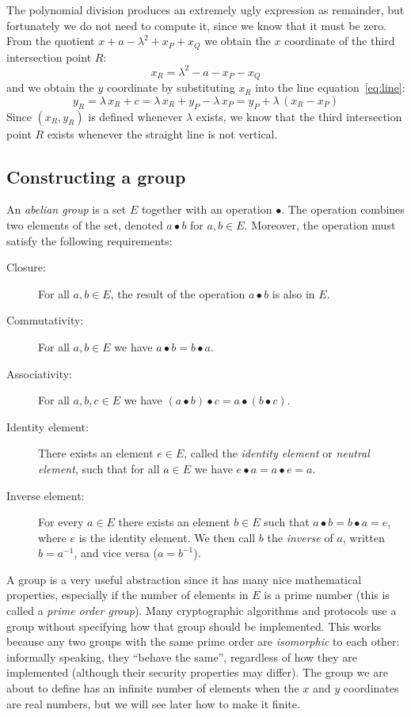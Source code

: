 \documentclass{article}
\begin{document}
The polynomial division produces an extremely ugly expression as remainder, but fortunately we do not need to compute it, since we know that it must be zero.
From the quotient $x + a - \lambda^2 + x_P + x_Q$ we obtain the $x$ coordinate of the third intersection point $R$:
\begin{equation}
x_R = \lambda^2 - a - x_P - x_Q \label{eq:xR}
\end{equation}
and we obtain the $y$ coordinate by substituting $x_R$ into the line equation~\eqref{eq:line}:
\begin{equation}
y_R = \lambda\,x_R + c = \lambda\,x_R + y_P - \lambda\,x_P = y_P + \lambda\,(x_R - x_P) \label{eq:yR}
\end{equation}
Since $(x_R, y_R)$ is defined whenever $\lambda$ exists, we know that the third intersection point $R$ exists whenever the straight line is not vertical.

\subsection{Constructing a group}\label{sec:group-construction}

An \emph{abelian group} is a set $E$ together with an operation $\bullet$.
The operation combines two elements of the set, denoted $a \bullet b$ for $a, b \in E$.
Moreover, the operation must satisfy the following requirements:
\begin{description}
\item[Closure:] For all $a, b \in E$, the result of the operation $a \bullet b$ is also in $E$.
\item[Commutativity:] For all $a, b \in E$ we have $a \bullet b = b \bullet a$.
\item[Associativity:] For all $a, b, c \in E$ we have $(a \bullet b) \bullet c = a \bullet (b \bullet c)$.
\item[Identity element:] There exists an element $e \in E$, called the \emph{identity element} or \emph{neutral element}, such that for all $a \in E$ we have $e \bullet a = a \bullet e = a$.
\item[Inverse element:] For every $a \in E$ there exists an element $b \in E$ such that $a \bullet b = b \bullet a = e$, where $e$ is the identity element. We then call $b$ the \emph{inverse} of $a$, written $b = a^{-1}$, and vice versa ($a = b^{-1}$).
\end{description}

A group is a very useful abstraction since it has many nice mathematical properties, especially if the number of elements in $E$ is a prime number (this is called a \emph{prime order group}).
Many cryptographic algorithms and protocols use a group without specifying how that group should be implemented.
This works because any two groups with the same prime order are \emph{isomorphic} to each other: informally speaking, they ``behave the same'', regardless of how they are implemented (although their security properties may differ).
The group we are about to define has an infinite number of elements when the $x$ and $y$ coordinates are real numbers, but we will see later how to make it finite.
\end{document}
